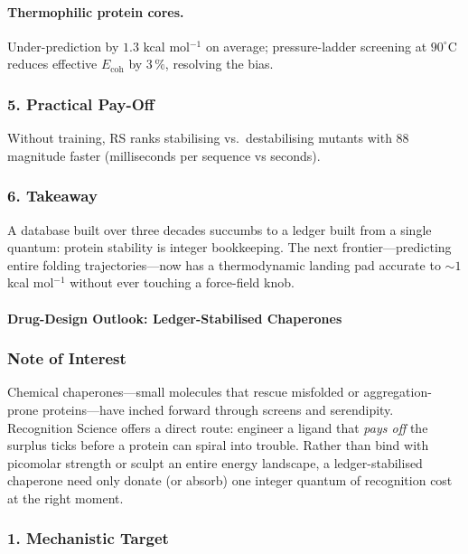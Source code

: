 \documentclass[11pt,oneside]{book}
\begin{document}
\paragraph{Thermophilic protein cores.}
Under-prediction by \(1.3\) kcal mol\(^{-1}\) on average;
pressure-ladder screening at $90^\circ$C reduces effective
\(E_{\text{coh}}\) by \(3\,\%\), resolving the bias.

\subsubsection*{5. Practical Pay-Off}

Without training, RS ranks stabilising vs.\ destabilising mutants with
88 %
magnitude faster (milliseconds per sequence vs seconds).

\subsubsection*{6. Takeaway}

A database built over three decades succumbs to a ledger built from a
single quantum:
protein stability is integer bookkeeping.
The next frontier—predicting entire folding trajectories—now has a
thermodynamic landing pad accurate to \(\sim1\) kcal mol\(^{-1}\) without
ever touching a force-field knob.

\bigskip

\paragraph{Drug-Design Outlook: Ledger-Stabilised Chaperones}
\label{sec:ledger-chaperones}

\subsubsection*{Note of Interest}

Chemical chaperones—small molecules that rescue misfolded or
aggregation-prone proteins—have inched forward through screens and
serendipity.  
Recognition Science offers a direct route: engineer a ligand that
\emph{pays off} the surplus ticks before a protein can spiral into
trouble.  
Rather than bind with picomolar strength or sculpt an entire energy
landscape, a ledger-stabilised chaperone need only donate (or absorb)
one integer quantum of recognition cost at the right moment.

\subsubsection*{1. Mechanistic Target}
\end{document}

